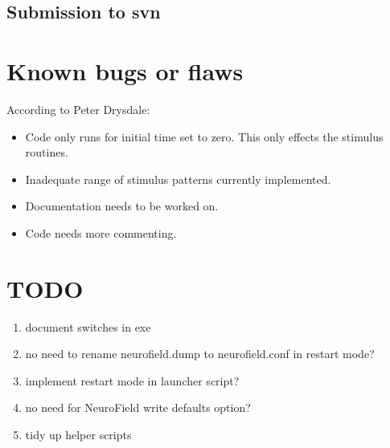 \documentclass[12pt,a4paper]{article}
\begin{document}
\subsection{Submission to svn}

\section{Known bugs or flaws}
According to Peter Drysdale:
\begin{itemize}
\item Code only runs for initial time set to zero. This only effects the stimulus routines.
\item Inadequate range of stimulus patterns currently implemented.
\item Documentation needs to be worked on.
\item Code needs more commenting.
\end{itemize}

\section{TODO}
\begin{enumerate}
\item document switches in exe
\item no need to rename neurofield.dump to neurofield.conf in restart mode?
\item implement restart mode in launcher script?
\item no need for NeuroField write defaults option?
\item tidy up helper scripts
\end{enumerate}
\end{document}
